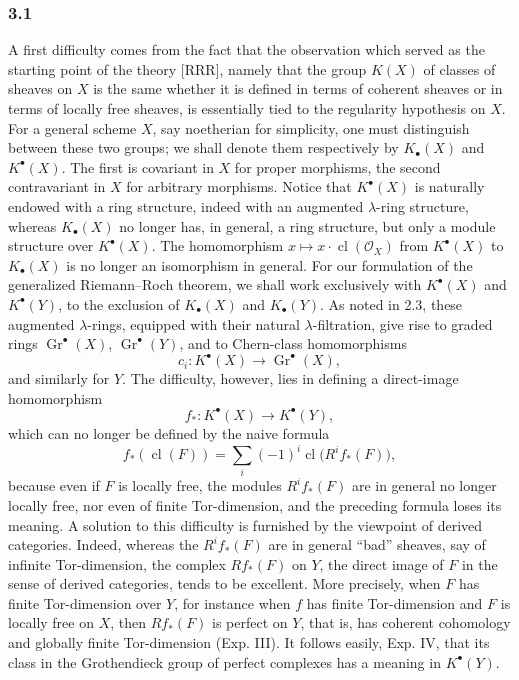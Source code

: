 \documentclass[11pt]{article}
\newcommand{\Gr}{\operatorname{Gr}}
\newcommand{\cl}{\operatorname{cl}}
\providecommand{\Gr}{\operatorname{Gr}}
\providecommand{\Gr}{\operatorname{G}}
\begin{document}
\subsubsection*{3.1}
A first difficulty comes from the fact that the observation which served as the starting point of the theory [RRR], namely that the group $K(X)$ of classes of sheaves on $X$ is the same whether it is defined in terms of coherent sheaves or in terms of locally free sheaves, is essentially tied to the regularity hypothesis on $X$. For a general scheme $X$, say noetherian for simplicity, one must distinguish between these two groups; we shall denote them respectively by $K_\bullet(X)$ and $K^\bullet(X)$. The first is covariant in $X$ for proper morphisms, the second contravariant in $X$ for arbitrary morphisms. Notice that $K^\bullet(X)$ is naturally endowed with a ring structure, indeed with an augmented $\lambda$-ring structure, whereas $K_\bullet(X)$ no longer has, in general, a ring structure, but only a module structure over $K^\bullet(X)$. The homomorphism $x\mapsto x\cdot\cl(\mathcal O_X)$ from $K^\bullet(X)$ to $K_\bullet(X)$ is no longer an isomorphism in general. For our formulation of the generalized Riemann--Roch theorem, we shall work exclusively with $K^\bullet(X)$ and $K^\bullet(Y)$, to the exclusion of $K_\bullet(X)$ and $K_\bullet(Y)$. As noted in 2.3, these augmented $\lambda$-rings, equipped with their natural $\lambda$-filtration, give rise to graded rings $\Gr^\bullet(X)$, $\Gr^\bullet(Y)$, and to Chern-class homomorphisms
\[
c_i:K^\bullet(X)\longrightarrow \Gr^\bullet(X),
\]
and similarly for $Y$. The difficulty, however, lies in defining a direct-image homomorphism
\begin{equation}\tag{3.1}
f_*:K^\bullet(X)\longrightarrow K^\bullet(Y),
\end{equation}
which can no longer be defined by the naive formula
\[
f_*(\cl(F))=\sum_i(-1)^i\cl\bigl(R^if_*(F)\bigr),
\]
because even if $F$ is locally free, the modules $R^if_*(F)$ are in general no longer locally free, nor even of finite Tor-dimension, and the preceding formula loses its meaning. A solution to this difficulty is furnished by the viewpoint of derived categories. Indeed, whereas the $R^if_*(F)$ are in general ``bad'' sheaves, say of infinite Tor-dimension, the complex $Rf_*(F)$ on $Y$, the direct image of $F$ in the sense of derived categories, tends to be excellent. More precisely, when $F$ has finite Tor-dimension over $Y$, for instance when $f$ has finite Tor-dimension and $F$ is locally free on $X$, then $Rf_*(F)$ is perfect on $Y$, that is, has coherent cohomology and globally finite Tor-dimension (Exp. III). It follows easily, Exp. IV, that its class in the Grothendieck group of perfect complexes has a meaning in $K^\bullet(Y)$.
\end{document}
